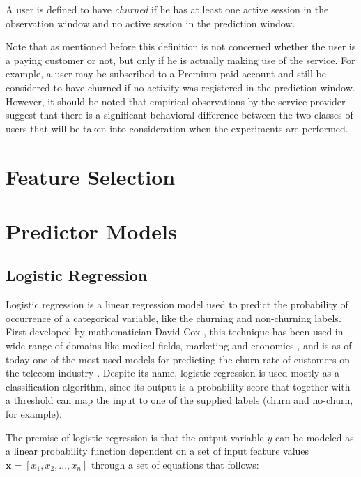 \documentclass{kththesis}
\begin{document}
\begin{definition}
A user is defined to have \emph{churned} if he has at least one active session in the observation window and no active session in the prediction window.
\end{definition}

Note that as mentioned before this definition is not concerned whether the user is a paying customer or not, but only if he is actually making use of the service. For example, a user may be subscribed to a Premium paid account and still be considered to have churned if no activity was registered in the prediction window. However, it should be noted that empirical observations by the service provider suggest that there is a significant behavioral difference between the two classes of users that will be taken into consideration when the experiments are performed. 

\section{Feature Selection}


\section{Predictor Models}

\subsection{Logistic Regression}

Logistic regression is a linear regression model used to predict the probability of occurrence of a categorical variable, like the churning and non-churning labels. First developed by mathematician David Cox \citep{cox1958regression}, this technique has been used in wide range of domains like medical fields, marketing and economics , and is as of today one of the most used models for predicting the churn rate of customers on the telecom industry \citep{mahajan2015review}. Despite its name, logistic regression is used mostly as a classification algorithm, since its output is a probability score that together with a threshold can map the input to one of the supplied labels (churn and no-churn, for example).

The premise of logistic regression is that the output variable $y$ can be modeled as a linear probability function dependent on a set of input feature values  $\bm{x} = [x_1, x_2, ..., x_n]$ through a set of equations that follows:
\end{document}
